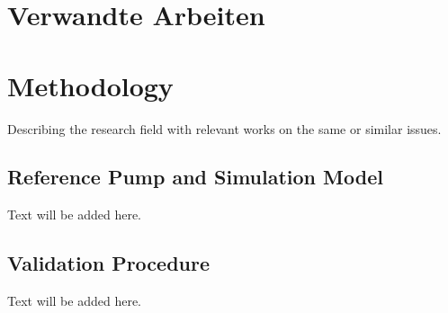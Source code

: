   {\chapter{Verwandte Arbeiten}}
  {\chapter{Methodology}}
\label{sec:related}

Describing the research field with relevant works on the same or similar issues.

\section{Reference Pump and Simulation Model}
Text will be added here.

\section{Validation Procedure}
Text will be added here.

